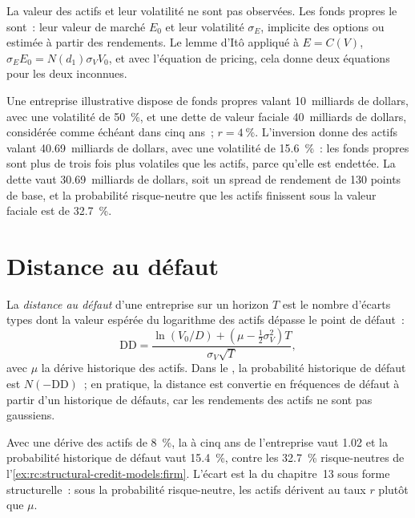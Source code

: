La valeur des actifs et leur volatilité ne sont pas observées. Les fonds propres le sont~: leur valeur de marché $E_0$
et leur volatilité $\sigma_E$, implicite des options ou estimée à partir des rendements. Le lemme d'Itô
appliqué à $E = C(V)$, $\sigma_EE_0 = N(d_1)\sigma_VV_0$, et avec l'équation de pricing, cela
donne deux équations pour les deux inconnues.

\label{lst:rc:structural-credit-models:invert}

\begin{example}\label{ex:rc:structural-credit-models:firm}
Une entreprise illustrative dispose de fonds propres valant 10~milliards de dollars, avec une volatilité de 50~\%, et une dette
de valeur faciale 40~milliards de dollars, considérée comme échéant dans cinq ans~; $r = 4~\%$. L'inversion donne des actifs
valant 40.69~milliards de dollars, avec une volatilité de 15.6~\%~: les fonds propres sont plus de trois fois
plus volatiles que les actifs, parce qu'elle est endettée. La dette vaut 30.69~milliards de dollars, soit un spread de rendement
de 130 points de base, et la probabilité risque-neutre que les actifs finissent sous la valeur faciale
est de 32.7~\%.
\end{example}

\section{Distance au défaut}

\begin{definition}\label{def:rc:structural-credit-models:dd}
La \emph{distance au défaut} d'une entreprise sur un horizon $T$ est
le nombre d'écarts types dont la valeur espérée du logarithme des actifs dépasse le
point de défaut~:
\[
\mathrm{DD} = \frac{\ln(V_0/D)+(\mu-\tfrac12\sigma_V^2)T}{\sigma_V\sqrt T},
\]
avec $\mu$ la dérive historique des actifs. Dans le , la probabilité historique de
défaut est $N(-\mathrm{DD})$~; en pratique, la distance est convertie en fréquences de défaut
à partir d'un historique de défauts, car les rendements des actifs ne sont pas gaussiens.
\end{definition}

\begin{example}\label{ex:rc:structural-credit-models:dd}
Avec une dérive des actifs de 8~\%, la  à cinq ans de l'entreprise vaut 1.02 et la
probabilité historique de défaut vaut 15.4~\%, contre les 32.7~\% risque-neutres de
l'\cref{ex:rc:structural-credit-models:firm}. L'écart est la 
du chapitre~13 sous forme structurelle~: sous la probabilité risque-neutre, les actifs dérivent au taux $r$
plutôt que $\mu$.
\end{example}

